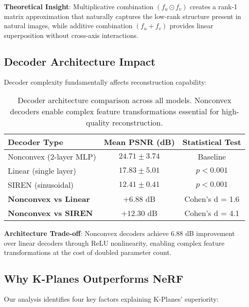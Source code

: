 \documentclass[10pt,twocolumn,letterpaper]{article}
\begin{document}
\textbf{Theoretical Insight}: Multiplicative combination $(f_u \odot f_v)$ creates a rank-1 matrix approximation that naturally captures the low-rank structure present in natural images, while additive combination $(f_u + f_v)$ provides linear superposition without cross-axis interactions.

\subsection{Decoder Architecture Impact}

Decoder complexity fundamentally affects reconstruction capability:

\begin{table}[t]
\centering
\small
\begin{tabular}{@{}lcc@{}}
\toprule
\textbf{Decoder Type} & \textbf{Mean PSNR (dB)} & \textbf{Statistical Test} \\
\midrule
Nonconvex (2-layer MLP) & $24.71 \pm 3.74$ & Baseline \\
Linear (single layer) & $17.83 \pm 5.01$ & $p < 0.001$ \\
SIREN (sinusoidal) & $12.41 \pm 0.41$ & $p < 0.001$ \\
\midrule
\textbf{Nonconvex vs Linear} & $\mathbf{+6.88}$ dB & Cohen's d = 1.6 \\
\textbf{Nonconvex vs SIREN} & $\mathbf{+12.30}$ dB & Cohen's d = 4.1 \\
\bottomrule
\end{tabular}
\caption{Decoder architecture comparison across all models. Nonconvex decoders enable complex feature transformations essential for high-quality reconstruction.}
\label{tab:decoder_comparison}
\end{table}

\textbf{Architecture Trade-off}: Nonconvex decoders achieve 6.88 dB improvement over linear decoders through ReLU nonlinearity, enabling complex feature transformations at the cost of doubled parameter count.

\subsection{Why K-Planes Outperforms NeRF}

Our analysis identifies four key factors explaining K-Planes' superiority:
\end{document}
